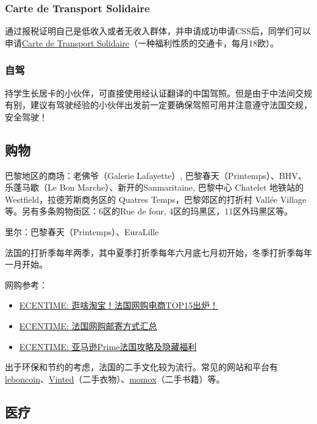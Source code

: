 \subsubsection{Carte de Transport Solidaire}
通过报税证明自己是低收入或者无收入群体，并申请成功申请CSS后，同学们可以申请\href{https://www.solidaritetransport.fr/}{Carte de Transport Solidaire}（一种福利性质的交通卡，每月18欧）。

\subsubsection{自驾}
持学⽣长居卡的⼩伙伴，可直接使用经认证翻译的中国驾照。但是由于中法间交规有别，建议有驾驶经验的⼩伙伴出发前⼀定要确保驾照可用并注意遵守法国交规，安全驾驶！

\subsection{购物}
	
巴黎地区的商场：老佛爷（Galerie Lafayette）, 巴黎春天（Printemps）、BHV、乐蓬马歇（Le Bon Marche）、新开的Sanmaritaine, 巴黎中心 Chatelet 地铁站的Westfield，拉德芳斯商务区的 Quatres Temps，巴黎郊区的打折村 Vallée Village等。另有多条购物街区：6区的Rue de four, 4区的玛黑区，11区外玛黑区等。

里尔：巴黎春天（Printemps）、EuraLille

法国的打折季每年两季，其中夏季打折季每年六月底七月初开始，冬季打折季每年一月开始。

网购参考：
\begin{itemize}
    \item \href{https://www.ecentime.com/article/ecommerce-fr-top15}{ECENTIME: 逛啥淘宝！法国网购电商TOP15出炉！}
    \item \href{https://www.ecentime.com/article/online-shopping-delivery}{ECENTIME: 法国网购邮寄方式汇总}
    \item \href{https://www.ecentime.com/article/amazon-fr-skill-1}{ECENTIME: 亚马逊Prime法国攻略及隐藏福利}
\end{itemize}

出于环保和节约的考虑，法国的二手文化较为流行。常见的网站和平台有\href{https://www.leboncoin.fr/}{leboncoin}、\href{https://www.vinted.fr/}{Vinted}（二手衣物）、\href{https://www.momox-shop.fr/}{momox}（二手书籍）等。


\subsection{医疗}


